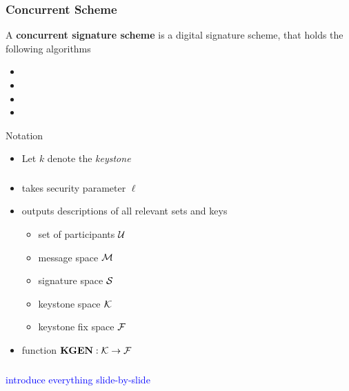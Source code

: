 \begin{frame}
	\frametitle{Concurrent Scheme}

	\begin{definition}
		A \textbf{concurrent signature scheme} is a digital signature scheme, that holds the following algorithms
		\begin{itemize}
			\item \setup
			\item \asign
			\item \averify
			\item \verify
		\end{itemize}
	\end{definition}

	\begin{block}{Notation}
		\begin{itemize}
			\item Let $k$ denote the \textit{keystone}
		\end{itemize}
	\end{block}
\end{frame}

\begin{frame}
	\frametitle{\setup}

	\begin{itemize}
		\item takes security parameter $\ell$
		\item outputs descriptions of all relevant sets and keys
			\begin{itemize}
				\item set of participants $\mathcal{U}$
				\item message space $\mathcal{M}$
				\item signature space $\mathcal{S}$
				\item keystone space $\mathcal{K}$
				\item keystone fix space $\mathcal{F}$
			\end{itemize}
		\item function $\textbf{KGEN}: \mathcal{K} \to \mathcal{F}$
	\end{itemize}
\end{frame}

\begin{frame}
	\frametitle{\asign}

	\begin{center}	
	\end{center}

	\textcolor{blue}{\small introduce everything slide-by-slide}
\end{frame}

